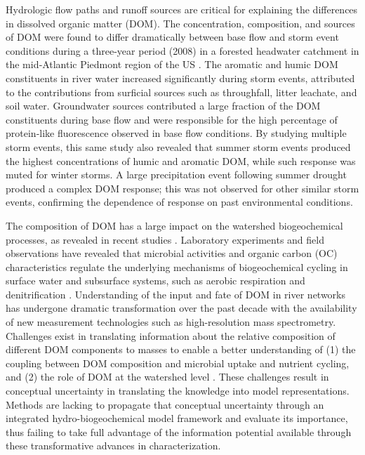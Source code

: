 \documentclass[preprint,review, 12pt]{elsarticle}
\begin{document}
Hydrologic flow paths and runoff sources are critical for explaining the differences in dissolved organic matter (DOM). The concentration, composition, and sources of DOM were found to differ dramatically between base flow and storm event conditions during a three{-}year period (2008) in a forested headwater catchment in the mid{‐}Atlantic Piedmont region of the US \citep{Inamdar2011}. The aromatic and humic DOM constituents in river water increased significantly during storm events, attributed to the contributions from surficial sources such as throughfall, litter leachate, and soil water. Groundwater sources contributed a large fraction of the DOM constituents during base flow and were responsible for the high percentage of protein‐like fluorescence observed in base flow conditions. By studying multiple storm events, this same study \citep{Inamdar2011} also revealed that summer storm events produced the highest concentrations of humic and aromatic DOM, while such response was muted for winter storms. A large precipitation event following summer drought produced a complex DOM response; this was not observed for other similar storm events, confirming the dependence of response on past environmental conditions. 

The composition of DOM has a large impact on the watershed biogeochemical processes, as revealed in recent studies \citep{Stegen2018,Goldman2017a,Graham2017d}. Laboratory experiments and field observations have revealed that microbial activities and organic carbon (OC) characteristics regulate the underlying mechanisms of biogeochemical cycling in surface water and subsurface systems, such as aerobic respiration and denitrification \citep{Stegen2018,Goldman2017a,Graham2017d}. Understanding of the input and fate of DOM in river networks has undergone dramatic transformation over the past decade with the availability of new measurement technologies such as high-resolution mass spectrometry. Challenges exist in translating information about the relative composition of different DOM components to masses to enable a better understanding of (1) the coupling between DOM composition and microbial uptake and nutrient cycling, and (2) the role of DOM at the watershed level \citep{Inamdar2011}. These challenges result in conceptual uncertainty in translating the knowledge into model representations. Methods are lacking to propagate that conceptual uncertainty through an integrated hydro-biogeochemical model framework and evaluate its importance, thus failing to take full advantage of the information potential available through these transformative advances in characterization.
            
\end{document}
